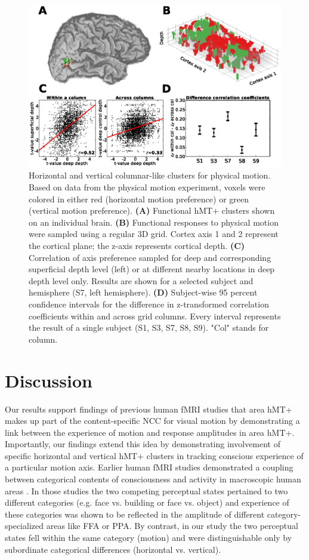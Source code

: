 \begin{figure}[htb!]
\centering
\includegraphics[width=\textwidth]{figures/chapter_03/fig4.eps}
\caption{Horizontal and vertical columnar-like clusters for physical motion. Based on data from the physical motion experiment, voxels were colored in either red (horizontal motion preference) or green (vertical motion preference). \textbf{(A)} Functional hMT+ clusters shown on an individual brain. \textbf{(B)} Functional responses to physical motion were sampled using a regular 3D grid. Cortex axis 1 and 2 represent the cortical plane; the z-axis represents cortical depth. \textbf{(C)} Correlation of axis preference sampled for deep and corresponding superficial depth level (left) or at different nearby locations in deep depth level only. Results are shown for a selected subject and hemisphere (S7, left hemisphere). \textbf{(D)} Subject-wise 95 percent confidence intervals for the difference in z-transformed correlation coefficients within and across grid columns. Every interval represents the result of a single subject (S1, S3, S7, S8, S9). "Col" stands for column.}
\label{fig:clusters}
\end{figure}

\section{Discussion}
Our results support findings of previous human fMRI studies \parencite{Sterzer2002,Muckli2002,Castelo-Branco2002, Kamitani2006, Brouwer2007} that area hMT+ makes up part of the content-specific NCC for visual motion by demonstrating a link between the experience of motion and response amplitudes in area hMT+. Importantly, our findings extend this idea by demonstrating involvement of specific horizontal and vertical hMT+ clusters in tracking conscious experience of a particular motion axis. Earlier human fMRI studies demonstrated a coupling between categorical contents of consciousness and activity in macroscopic human areas \parencite{Tong1998,Hasson2001,Andrews2002}. In those studies the two competing perceptual states pertained to two different categories (e.g. face vs. building or face vs. object) and experience of these categories was shown to be reflected in the amplitude of different category-specialized areas like FFA or PPA. By contrast, in our study the two perceptual states fell within the same category (motion) and were distinguishable only by subordinate categorical differences (horizontal vs. vertical).

